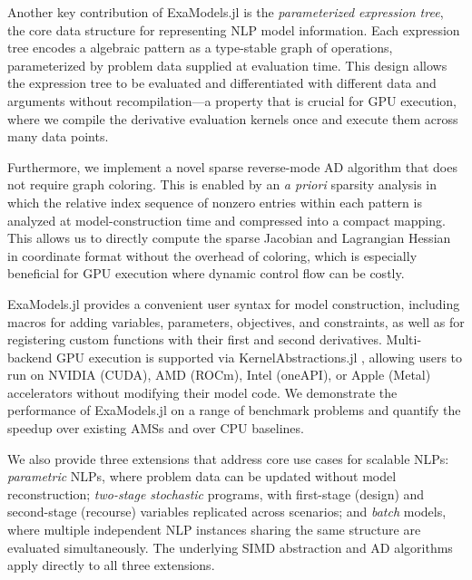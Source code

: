 \documentclass[11pt]{article}
\begin{document}
Another key contribution of ExaModels.jl is the \emph{parameterized expression tree}, the core data structure for representing NLP model information. Each expression tree encodes a algebraic pattern as a type-stable graph of operations, parameterized by problem data supplied at evaluation time. This design allows the expression tree to be evaluated and differentiated with different data and arguments without recompilation---a property that is crucial for GPU execution, where we compile the derivative evaluation kernels once and execute them across many data points.

Furthermore, we implement a novel sparse reverse-mode AD algorithm that does not require graph coloring. This is enabled by an \emph{a priori} sparsity analysis in which the relative index sequence of nonzero entries within each pattern is analyzed at model-construction time and compressed into a compact mapping. This allows us to directly compute the sparse Jacobian and Lagrangian Hessian in coordinate format without the overhead of coloring, which is especially beneficial for GPU execution where dynamic control flow can be costly.

ExaModels.jl provides a convenient user syntax for model construction, including macros for adding variables, parameters, objectives, and constraints, as well as for registering custom functions with their first and second derivatives. Multi-backend GPU execution is supported via KernelAbstractions.jl \citep{churavyKernelAbstractionsjl2025}, allowing users to run on NVIDIA (CUDA), AMD (ROCm), Intel (oneAPI), or Apple (Metal) accelerators without modifying their model code. We demonstrate the performance of ExaModels.jl on a range of benchmark problems and quantify the speedup over existing AMSs and over CPU baselines.

We also provide three extensions that address core use cases for scalable NLPs: \emph{parametric} NLPs, where problem data can be updated without model reconstruction; \emph{two-stage stochastic} programs, with first-stage (design) and second-stage (recourse) variables replicated across scenarios; and \emph{batch} models, where multiple independent NLP instances sharing the same structure are evaluated simultaneously. The underlying SIMD abstraction and AD algorithms apply directly to all three extensions.
\end{document}
